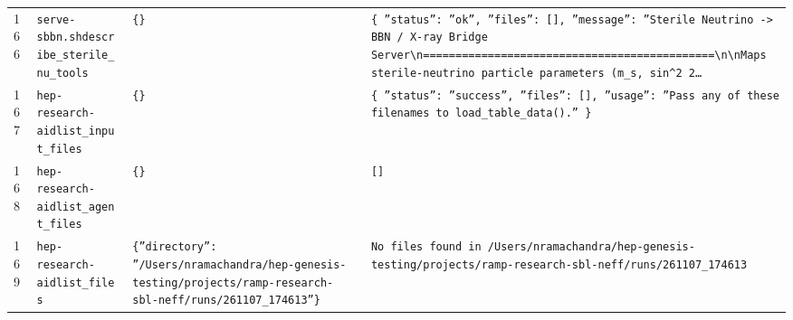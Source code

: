 \documentclass[11pt,a4paper]{article}
\begin{document}
\begin{longtable}{@{}p{}p{}p{}p{}@{}}
166 & \texttt{serve-sbbn.sh}\newline\texttt{describe\_\allowbreak{}sterile\_\allowbreak{}nu\_\allowbreak{}tools} & \texttt{\{\}\allowbreak{}} & \texttt{\{   ''status'':\allowbreak{} ''ok'',\allowbreak{}   ''files'':\allowbreak{} []\allowbreak{},\allowbreak{}   ''message'':\allowbreak{} ''Sterile Neutrino -\textgreater{}\allowbreak{} BBN /\allowbreak{} X-ray Bridge Server\textbackslash{}\allowbreak{}n=\allowbreak{}=\allowbreak{}=\allowbreak{}=\allowbreak{}=\allowbreak{}=\allowbreak{}=\allowbreak{}=\allowbreak{}=\allowbreak{}=\allowbreak{}=\allowbreak{}=\allowbreak{}=\allowbreak{}=\allowbreak{}=\allowbreak{}=\allowbreak{}=\allowbreak{}=\allowbreak{}=\allowbreak{}=\allowbreak{}=\allowbreak{}=\allowbreak{}=\allowbreak{}=\allowbreak{}=\allowbreak{}=\allowbreak{}=\allowbreak{}=\allowbreak{}=\allowbreak{}=\allowbreak{}=\allowbreak{}=\allowbreak{}=\allowbreak{}=\allowbreak{}=\allowbreak{}=\allowbreak{}=\allowbreak{}=\allowbreak{}=\allowbreak{}=\allowbreak{}=\allowbreak{}=\allowbreak{}=\allowbreak{}=\allowbreak{}=\allowbreak{}\textbackslash{}\allowbreak{}n\textbackslash{}\allowbreak{}nMaps sterile-neutrino particle parameters (m\_\allowbreak{}s,\allowbreak{} sin\textasciicircum{}\allowbreak{}2 2\ldots{}\allowbreak{}} \\
167 & \texttt{hep-research-aid}\newline\texttt{list\_\allowbreak{}input\_\allowbreak{}files} & \texttt{\{\}\allowbreak{}} & \texttt{\{   ''status'':\allowbreak{} ''success'',\allowbreak{}   ''files'':\allowbreak{} []\allowbreak{},\allowbreak{}   ''usage'':\allowbreak{} ''Pass any of these filenames to load\_\allowbreak{}table\_\allowbreak{}data()\allowbreak{}.'' \}\allowbreak{}} \\
168 & \texttt{hep-research-aid}\newline\texttt{list\_\allowbreak{}agent\_\allowbreak{}files} & \texttt{\{\}\allowbreak{}} & \texttt{[]\allowbreak{}} \\
169 & \texttt{hep-research-aid}\newline\texttt{list\_\allowbreak{}files} & \texttt{\{''directory'':\allowbreak{} ''/\allowbreak{}Users/\allowbreak{}nramachandra/\allowbreak{}hep-genesis-testing/\allowbreak{}projects/\allowbreak{}ramp-research-sbl-neff/\allowbreak{}runs/\allowbreak{}261107\_\allowbreak{}174613''\}\allowbreak{}} & \texttt{No files found in /\allowbreak{}Users/\allowbreak{}nramachandra/\allowbreak{}hep-genesis-testing/\allowbreak{}projects/\allowbreak{}ramp-research-sbl-neff/\allowbreak{}runs/\allowbreak{}261107\_\allowbreak{}174613} \\

\end{longtable}
\end{document}
